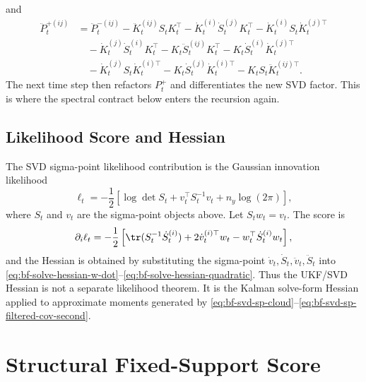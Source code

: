 and
\begin{align}
\label{eq:bf-svd-sp-filtered-cov-second}
  \ddot P_t^{+(ij)}
  &=
  \ddot P_t^{-(ij)}
  -\ddot K_t^{(ij)}S_tK_t^\top
  -\dot K_t^{(i)}\dot S_t^{(j)}K_t^\top
  -\dot K_t^{(i)}S_t\dot K_t^{(j)\top} \nonumber\\
  &\quad
  -\dot K_t^{(j)}\dot S_t^{(i)}K_t^\top
  -K_t\ddot S_t^{(ij)}K_t^\top
  -K_t\dot S_t^{(i)}\dot K_t^{(j)\top} \nonumber\\
  &\quad
  -\dot K_t^{(j)}S_t\dot K_t^{(i)\top}
  -K_t\dot S_t^{(j)}\dot K_t^{(i)\top}
  -K_tS_t\ddot K_t^{(ij)\top}.
\end{align}
The next time step then refactors $P_t^+$ and differentiates the new SVD factor.
This is where the spectral contract below enters the recursion again.

\subsection{Likelihood Score and Hessian}
\label{sec:bf-svd-sp-likelihood-derivatives}

The SVD sigma-point likelihood contribution is the Gaussian innovation
likelihood
\[
  \ell_t
  =
  -\frac{1}{2}
  \left[
    \log\det S_t+v_t^\top S_t^{-1}v_t+n_y\log(2\pi)
  \right],
\]
where $S_t$ and $v_t$ are the sigma-point objects above.  Let
$S_tw_t=v_t$.  The score is
\begin{equation}
\label{eq:bf-svd-sp-score}
  \partial_i\ell_t
  =
  -\frac{1}{2}
  \left[
    \tr(S_t^{-1}\dot S_t^{(i)})
    +2\dot v_t^{(i)\top}w_t
    -w_t^\top\dot S_t^{(i)}w_t
  \right],
\end{equation}
and the Hessian is obtained by substituting the sigma-point
$\dot v_t,\dot S_t,\ddot v_t,\ddot S_t$ into
\eqref{eq:bf-solve-hessian-w-dot}--\eqref{eq:bf-solve-hessian-quadratic}.
Thus the UKF/SVD Hessian is not a separate likelihood theorem.  It is the
Kalman solve-form Hessian applied to approximate moments generated by
\eqref{eq:bf-svd-sp-cloud}--\eqref{eq:bf-svd-sp-filtered-cov-second}.

\section{Structural Fixed-Support Score}
\label{sec:bf-svd-sp-structural-fixed-support-score}

